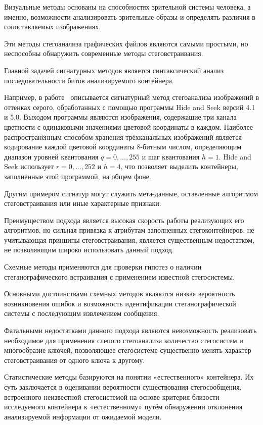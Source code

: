 Визуальные методы основаны на способностях зрительной системы человека, а именно, возможности анализировать зрительные образы и определять различия в сопоставляемых изображениях.

Эти методы стегоанализа графических файлов являются самыми простыми, но неспособны обнаружить современные методы стеговстраивания.

Главной задачей сигнатурных методов является синтаксический анализ последовательности битов анализируемого контейнера.

Например, в работе~\cite{HideAndSeek} описывается сигнатурный метод стегоанализа изображений в оттенках серого, обработанных с помощью программы Hide and Seek версий 4.1 и 5.0. Выходом программы являются изображения, содержащие три канала цветности с одинаковыми значениями цветовой координаты в каждом. Наиболее распространённым способом хранения трёхканальных изображений является кодирование каждой цветовой координаты 8-битным числом, определяющим диапазон уровней квантования $ q = {0,...,255} $ и шаг квантования $ h = 1 $. Hide and Seek использует $ r = {0,...,252} $ и $ h = 4 $, что позволяет выделить контейнеры, заполненные этой программой, на общем фоне.

Другим примером сигнатур могут служить мета-данные, оставленные алгоритмом стеговстраивания или иные характерные признаки.

Преимуществом подхода является высокая скорость работы реализующих его алгоритмов, но сильная привязка к атрибутам заполненных стегоконтейнеров, не учитывающая принципы стеговстраивания, является существенным недостатком, не позволяющим широко использовать данный подход.

Схемные методы применяются для проверки гипотез о наличии стеганографического встраивания с применением известной стегосистемы.

Основными достоинствами схемных методов являются низкая вероятность возникновения ошибок и возможность идентификации стеганографической системы с последующим извлечением сообщения.

Фатальными недостатками данного подхода являются невозможность реализовать необходимое для применения слепого стегоанализа количество стегосистем и многообразие ключей, позволяющее стегосистеме существенно менять характер стеговстраивания от одного ключа к другому.

Статистические методы базируются на понятии «естественного» контейнера. Их суть заключается в оценивании вероятности существования стегосообщения, встроенного неизвестной стегосистемой на основе критерия близости исследуемого контейнера к «естественному» путём обнаружении отклонения анализируемой информации от ожидаемой модели.

